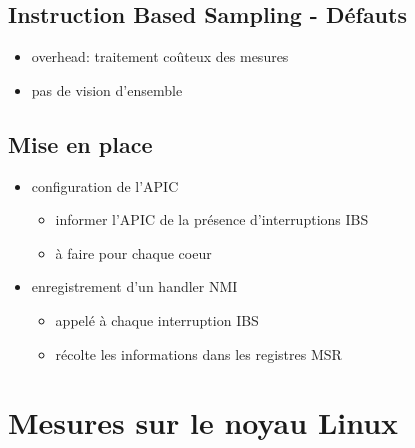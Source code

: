 \documentclass[mathserif]{beamer}
\newcommand{\bframe}{\begin{frame}{\secname}{\subsecname}}
\begin{document}
    \subsection{Instruction Based Sampling - Défauts}
     \bframe
       \begin{itemize}
         \item overhead: traitement coûteux des mesures
         \item pas de vision d'ensemble
       \end{itemize}
     \end{frame}

    \subsection{Mise en place}
      \bframe
        \begin{itemize}
          \item configuration de l'APIC
          \begin{itemize}
            \item informer l'APIC de la présence d'interruptions IBS
            \item à faire pour chaque coeur
          \end{itemize}
          \item enregistrement d'un handler NMI
          \begin{itemize}
            \item appelé à chaque interruption IBS
            \item récolte les informations dans les registres MSR
          \end{itemize}
        \end{itemize}
      \end{frame}

  \section{Mesures sur le noyau Linux}
\end{document}
